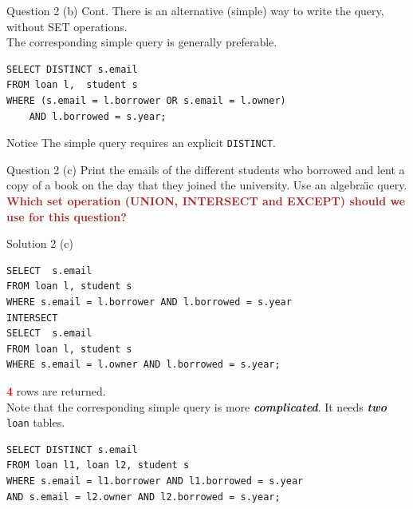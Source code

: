 \begin{frame}[fragile]{Question 2 (b) Cont.}
There is an alternative (simple) way to write the query, without SET operations.\\
\vspace{10pt}
The corresponding simple query is generally preferable.

\begin{lstlisting}
SELECT DISTINCT s.email 
FROM loan l,  student s 
WHERE (s.email = l.borrower OR s.email = l.owner) 
	AND l.borrowed = s.year;
\end{lstlisting}

\begin{alertblock}{Notice}
The simple query requires an explicit \texttt{DISTINCT}.	
\end{alertblock}

\end{frame}

\begin{frame}[fragile]{Question 2 (c)}
Print the emails of the different students who borrowed and lent a copy of a book on the day that they joined the university. Use an algebra\"{\i}c query.\\
\vspace{10pt}
\textcolor{brown}{\textbf{Which set operation (UNION, INTERSECT and EXCEPT) should we use for this question?}}
\end{frame}

\begin{frame}[fragile]{Solution 2 (c)}
\begin{lstlisting}
SELECT  s.email 
FROM loan l, student s 
WHERE s.email = l.borrower AND l.borrowed = s.year
INTERSECT
SELECT  s.email 
FROM loan l, student s 
WHERE s.email = l.owner AND l.borrowed = s.year;
\end{lstlisting}
\vspace{5pt}
\textcolor{red}{\textbf{4}} rows are returned.\\
\vspace{10pt}
Note that the corresponding simple query is more \textit{\textbf{complicated}}. It needs \textbf{\textit{two}} \texttt{loan} tables.

\begin{lstlisting}
SELECT DISTINCT s.email 
FROM loan l1, loan l2, student s 
WHERE s.email = l1.borrower AND l1.borrowed = s.year 
AND s.email = l2.owner AND l2.borrowed = s.year;
\end{lstlisting}
\end{frame}

